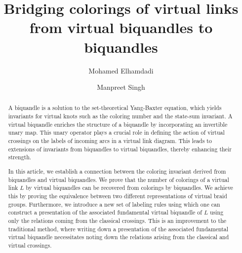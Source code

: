 \documentclass[11pt, reqno]{amsart}
\theoremstyle{definition}
\begin{document}
\title{Bridging colorings of virtual links from virtual biquandles to biquandles}
\author{Mohamed Elhamdadi}
\author{Manpreet Singh}
\address{University of South Florida, \\
Tampa, FL, 33620}


\begin{abstract}
A biquandle is a solution to the set-theoretical Yang-Baxter equation, which yields invariants for virtual knots such as the coloring number and the state-sum invariant. A virtual biquandle enriches the structure of a biquandle by incorporating an invertible unary map. This unary operator plays a crucial role in defining the action of virtual crossings on the labels of incoming arcs in a virtual link diagram. This leads to extensions of invariants from biquandles to virtual biquandles, thereby enhancing their strength.

In this article, we establish a connection between the coloring invariant derived from biquandles and virtual biquandles. We prove that the number of colorings of a virtual link $L$ by virtual biquandles can be recovered from colorings by biquandles. We achieve this by proving the equivalence between two different representations of virtual braid groups. Furthermore, we introduce a new set of labeling rules using which one can construct a presentation of the associated fundamental virtual biquandle of $L$ using only the relations coming from the classical crossings. This is an improvement to the traditional method, where writing down a presentation of the associated fundamental virtual biquandle necessitates noting down the relations arising from the classical and virtual crossings.
\end{abstract}

\maketitle
\end{document}
